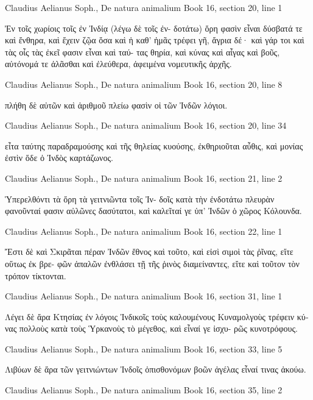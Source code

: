 \documentclass[12pt,letterpaper,twoside,final]{memoir}
\begin{document}
\begin{greek}
Claudius Aelianus Soph., De natura animalium 
Book 16, section 20, line 1

Ἐν τοῖς χωρίοις τοῖς ἐν Ἰνδίᾳ (λέγω δὲ τοῖς ἐν-
δοτάτω) ὄρη φασὶν εἶναι δύσβατά τε καὶ ἔνθηρα, καὶ 
ἔχειν ζῷα ὅσα καὶ ἡ καθ' ἡμᾶς τρέφει γῆ, ἄγρια δέ· 
καὶ γάρ τοι καὶ τὰς οἶς τὰς ἐκεῖ φασιν εἶναι καὶ ταύ-
τας θηρία, καὶ κύνας καὶ αἶγας καὶ βοῦς, αὐτόνομά 
τε ἀλᾶσθαι καὶ ἐλεύθερα, ἀφειμένα νομευτικῆς ἀρχῆς. 



Claudius Aelianus Soph., De natura animalium 
Book 16, section 20, line 8

πλήθη δὲ αὐτῶν καὶ ἀριθμοῦ πλείω φασὶν οἱ τῶν 
Ἰνδῶν λόγιοι. 



Claudius Aelianus Soph., De natura animalium 
Book 16, section 20, line 34

         εἶτα ταύτης παραδραμούσης καὶ τῆς θηλείας   
κυούσης, ἐκθηριοῦται αὖθις, καὶ μονίας ἐστὶν ὅδε 
ὁ Ἰνδὸς καρτάζωνος. 



Claudius Aelianus Soph., De natura animalium 
Book 16, section 21, line 2

Ὑπερελθόντι τὰ ὄρη τὰ γειτνιῶντα τοῖς Ἰν-
δοῖς κατὰ τὴν ἐνδοτάτω πλευρὰν φανοῦνταί φασιν 
αὐλῶνες δασύτατοι, καὶ καλεῖταί γε ὑπ' Ἰνδῶν 
ὁ χῶρος Κόλουνδα. 



Claudius Aelianus Soph., De natura animalium 
Book 16, section 22, line 1

Ἔστι δὲ καὶ Σκιρᾶται πέραν Ἰνδῶν ἔθνος καὶ 
τοῦτο, καὶ εἰσὶ σιμοὶ τὰς ῥῖνας, εἴτε οὕτως ἐκ βρε-
φῶν ἁπαλῶν ἐνθλάσει τῇ τῆς ῥινὸς διαμείναντες, 
εἴτε καὶ τοῦτον τὸν τρόπον τίκτονται. 



Claudius Aelianus Soph., De natura animalium 
Book 16, section 31, line 1

Λέγει δὲ ἄρα Κτησίας ἐν λόγοις Ἰνδικοῖς τοὺς   
καλουμένους Κυναμολγοὺς τρέφειν κύνας πολλοὺς 
κατὰ τοὺς Ὑρκανοὺς τὸ μέγεθος, καὶ εἶναί γε ἰσχυ-
ρῶς κυνοτρόφους. 



Claudius Aelianus Soph., De natura animalium 
Book 16, section 33, line 5

                                 Λιβύων δὲ ἄρα τῶν 
γειτνιώντων Ἰνδοῖς ὀπισθονόμων βοῶν ἀγέλας εἶναί 
τινας ἀκούω. 



Claudius Aelianus Soph., De natura animalium 
Book 16, section 35, line 2


\end{greek}
\end{document}
